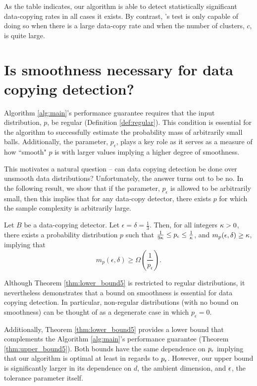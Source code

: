 As the table indicates, our algorithm is able to detect statistically significant data-copying rates in all cases it exists. By contrast, \cite{MCD2020}'s test is only capable of doing so when there is a large data-copy rate and when the number of clusters, $c$, is quite large.

\section{Is smoothness necessary for data copying detection?}\label{sec:lower_bound}

Algorithm \ref{alg:main}'s performance guarantee requires that the input distribution, $p$, be regular (Definition \ref{def:regular}). This condition is essential for the algorithm to successfully estimate the probability mass of arbitrarily small balls. Additionally, the parameter, $p_\epsilon$, plays a key role as it serves as a measure of how ``smooth" $p$ is with larger values implying a higher degree of smoothness. 

This motivates a natural question -- can data copying detection be done over unsmooth data distributions? Unfortunately, the answer turns out to be no. In the following result, we show that if the parameter, $p_\epsilon$ is allowed to be arbitrarily small, then this implies that for any data-copy detector, there exists $p$ for which the sample complexity is arbitrarily large.

\begin{theorem}\label{thm:lower_bound5}
Let $B$ be a data-copying detector. Let $\epsilon = \delta = \frac{1}{3}$. Then, for all integers $\kappa > 0$, there exists a probability distribution $p$ such that $\frac{1}{9\kappa} \leq p_\epsilon \leq \frac{1}{\kappa}$, and $m_p(\epsilon, \delta) \geq \kappa$, implying that $$m_p(\epsilon, \delta) \geq \Omega\left(\frac{1}{p_\epsilon}\right).$$
\end{theorem}

Although Theorem \ref{thm:lower_bound5} is restricted to regular distributions, it nevertheless demonstrates that a bound on smoothness is essential for data copying detection. In particular, non-regular distributions (with no bound on smoothness) can be thought of as a degenerate case in which $p_\epsilon = 0$. 

Additionally, Theorem \ref{thm:lower_bound5} provides a lower bound that complements the Algorithm \ref{alg:main}'s performance guarantee (Theorem \ref{thm:upper_bound5}). Both bounds have the same dependence on $p_\epsilon$ implying that our algorithm is optimal at least in regards to $p_\epsilon$. However, our upper bound is significantly larger in its dependence on $d$, the ambient dimension, and $\epsilon$, the tolerance parameter itself. 

